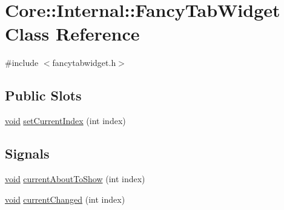 \hypertarget{class_core_1_1_internal_1_1_fancy_tab_widget}{\section{\-Core\-:\-:\-Internal\-:\-:\-Fancy\-Tab\-Widget \-Class \-Reference}
\label{class_core_1_1_internal_1_1_fancy_tab_widget}
}


{\ttfamily \#include $<$fancytabwidget.\-h$>$}

\subsection*{\-Public \-Slots}
\begin{DoxyCompactItemize}
\item 
\hyperlink{group___u_a_v_objects_plugin_ga444cf2ff3f0ecbe028adce838d373f5c}{void} \hyperlink{group___core_plugin_ga388605bdeb2516f88d2712b6cffcbc87}{set\-Current\-Index} (int index)
\end{DoxyCompactItemize}
\subsection*{\-Signals}
\begin{DoxyCompactItemize}
\item 
\hyperlink{group___u_a_v_objects_plugin_ga444cf2ff3f0ecbe028adce838d373f5c}{void} \hyperlink{group___core_plugin_ga6e5760754641a9442d324865472720ca}{current\-About\-To\-Show} (int index)
\item 
\hyperlink{group___u_a_v_objects_plugin_ga444cf2ff3f0ecbe028adce838d373f5c}{void} \hyperlink{group___core_plugin_ga310fc2ab77a5e5a2f66c229aaab8568a}{current\-Changed} (int index)
\end{DoxyCompactItemize}
